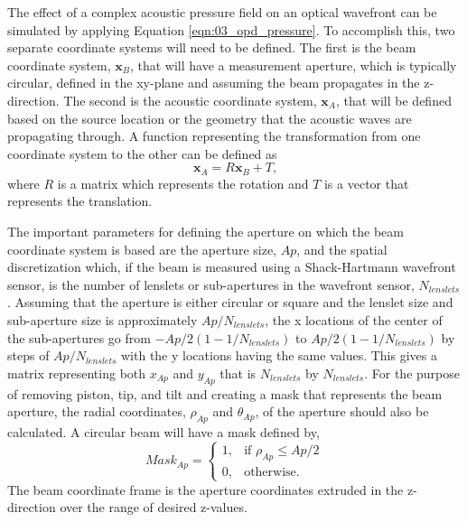 The effect of a complex acoustic pressure field on an optical wavefront can be simulated by applying Equation \ref{eqn:03_opd_pressure}.
To accomplish this, two separate coordinate systems will need to be defined.
The first is the beam coordinate system, $\mathbf{x}_B $, that will have a measurement aperture, which is typically circular, defined in the xy-plane and assuming the beam propagates in the z-direction.
The second is the acoustic coordinate system, $\mathbf{x}_A$, that will be defined based on the source location or the geometry that the acoustic waves are propagating through.
A function representing the transformation from one coordinate system to the other can be defined as
\begin{equation}
  \mathbf{x}_A = R\mathbf{x}_B+T \textrm{,}
  \label{eqn:03_coord_transform}
\end{equation}
where $R$ is a matrix which represents the rotation and $T$ is a vector that represents the translation.

The important parameters for defining the aperture on which the beam coordinate system is based are the aperture size, $Ap$, and the spatial discretization which, if the beam is measured using a Shack-Hartmann wavefront sensor, is the number of lenslets or sub-apertures in the wavefront sensor, $N_{lenslets}$.
Assuming that the aperture is either circular or square and the lenslet size and sub-aperture size is approximately $Ap/N_{lenslets}$, the x locations of the center of the sub-apertures go from $-Ap/2(1-1/N_{lenslets})$ to $Ap/2(1-1/N_{lenslets})$ by steps of $Ap/N_{lenslets}$ with the y locations having the same values.
This gives a matrix representing both $x_{Ap}$ and $y_{Ap}$ that is $N_{lenslets}$ by $N_{lenslets}$.
For the purpose of removing piston, tip, and tilt and creating a mask that represents the beam aperture, the radial coordinates, $\rho_{Ap}$ and $\theta_{Ap}$, of the aperture should also be calculated.
A circular beam will have a mask defined by,
\begin{equation}
  Mask_{Ap} =
  \begin{cases}
    1, & \text{if } \rho_{Ap}\leq Ap/2 \\
    0, & \text{otherwise.}
  \end{cases}
\end{equation}
The beam coordinate frame is the aperture coordinates extruded in the z-direction over the range of desired z-values.

